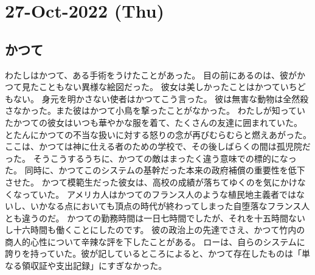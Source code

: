 \section{27-Oct-2022 (Thu)}
\subsection{かつて}

わたしはかつて、ある手術をうけたことがあった。
目の前にあるのは、彼がかつて見たこともない異様な絵図だった。
彼女は美しかったことはかつていちどもない。
身元を明かさない使者はかつてこう言った。
彼は無害な動物は全然殺さなかった。また彼はかつて小鳥を撃ったことがなかった。
わたしが知っていたかつての彼女はいつも華やかな服を着て、たくさんの友達に囲まれていた。
とたんにかつての不当な扱いに対する怒りの念が再びむらむらと燃えあがった。
ここは、かつては神に仕える者のための学校で、その後しばらくの間は孤児院だった。
そうこうするうちに、かつての敵はまったく違う意味での標的になった。
同時に、かつてこのシステムの基幹だった本来の政府補償の重要性を低下させた。
かつて模範生だった彼女は、高校の成績が落ちてゆくのを気にかけなくなっていた。
アメリカ人はかつてのフランス人のような植民地主義者ではないし、いかなる点においても頂点の時代が終わってしまった自堕落なフランス人とも違うのだ。
かつての勤務時間は一日七時間でしたが、それを十五時間ないし十六時間も働くことにしたのです。
彼の政治上の先達でさえ、かつて竹内の商人的心性について辛辣な評を下したことがある。
ローは、自らのシステムに誇りを持っていた。彼が記しているところによると、かつて存在したものは「単なる領収証や支出記録」にすぎなかった。